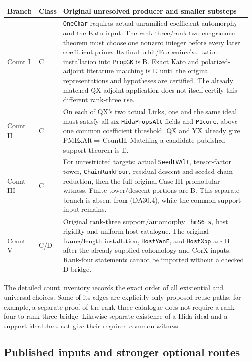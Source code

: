 \begin{center}
\begin{longtable}{p{.20\linewidth}p{.08\linewidth}p{.61\linewidth}}
Branch&Class&Original unresolved producer and smaller substeps\\\hline
Count I&C&\texttt{OneChar} requires actual unramified-coefficient
automorphy and the Kato input.  The rank-three/rank-two congruence theorem
must choose one nonzero integer before every later coefficient prime.
Its final orbit/Frobenius/valuation installation into \texttt{PropGK}
is B.  Exact Kato and polarized-adjoint literature matching is D until
the original representations and hypotheses are certified.  The
already matched QX adjoint application does not itself certify this
different rank-three use.\\
Count II&C&On each of QX's two actual Links, one and the same ideal must
satisfy all six \texttt{HidaPropsAlt} fields and \texttt{P1core}, above
one common coefficient threshold.  QX and YX already give
$\mathrm{PMExAlt}\Rightarrow\mathrm{CountII}$.
Matching a candidate published support theorem is D.\\
Count III&C&For unrestricted targets: actual \texttt{SeedIVAlt},
tensor-factor tower, \texttt{ChainRankFour}, residual descent and seeded
chain reduction, then the full original Case-III promodular witness.
Finite tower/descent portions are B.  This separate branch is absent
from (DA30.4), while the common support input remains.\\
Count V&C/D&Original rank-three support/automorphy \texttt{ThmS6\_s},
host rigidity and uniform host catalogue.  The original frame/length
installation, \texttt{HostVanE}, and \texttt{HostXpp} are B after the
already supplied cohomology and CorX inputs.  Rank-four statements
cannot be imported without a checked D bridge.\\
\end{longtable}
\end{center}

The detailed count inventory records the exact order of all existential
and universal choices.  Some of its edges are explicitly only proposed
reuse paths: for example, a separate proof of the rank-three catalogue
does not require a rank-four-to-rank-three bridge.  Likewise separate
existence of a Hida ideal and a support ideal does not give their
required common witness.

\subsection{Published inputs and stronger optional routes}

